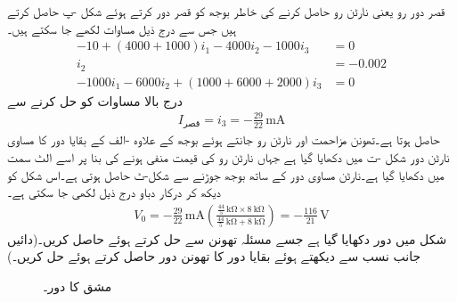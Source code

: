 قصر دور رو یعنی نارٹن رو حاصل کرنے کی خاطر  بوجھ کو قصر دور کرتے ہوئے شکل  -پ  حاصل کرتے ہیں جس سے درج ذیل مساوات لکھے جا سکتے ہیں۔
\begin{align*}
-10+(4000+1000)i_1-4000 i_2 - 1000 i_3&=0\\
i_2&=-0.002\\
-1000 i_1-6000i_2+(1000+6000+2000)i_3&=0
\end{align*} 
درج بالا مساوات کو حل کرنے سے
\begin{align*}
I_{\text{قصر}}=i_3=-\frac{29}{22} \, \si{\milli\ampere}
\end{align*}
حاصل ہوتا ہے۔تھونن مزاحمت اور نارٹن رو جانتے ہوئے    بوجھ کے علاوہ -الف کے بقایا دور کا مساوی نارٹن  دور شکل -ت میں دکھایا گیا ہے جہاں نارٹن رو کی قیمت منفی ہونے کی بنا پر اسے الٹ سمت میں دکھایا گیا ہے۔نارٹن مساوی دور کے ساتھ  بوجھ جوڑنے سے شکل-ٹ حاصل ہوتی ہے۔اس شکل کو دیکھ کر درکار دباو درج ذیل لکھی جا سکتی ہے۔
\begin{align*}
V_0=-\frac{29}{22}\, \si{\milli\ampere} \left(\frac{\frac{44}{5}\, \si{\kilo\ohm}\times \SI{8}{\kilo\ohm}}{\frac{44}{5}\, \si{\kilo\ohm} + \SI{8}{\kilo\ohm}} \right)=-\frac{116}{21} \, \si{\volt}
\end{align*}
شکل  میں دور دکھایا گیا ہے جسے  مسئلہ تھونن سے حل کرتے ہوئے  حاصل کریں۔(دائیں جانب نسب  سے دیکھتے ہوئے بقایا دور کا تھونن دور حاصل کرتے ہوئے حل کریں۔)
\begin{figure}
\centering
{}
\caption{مشق  کا دور۔}
\label{شکل_مسئلہ_مشق_تھونن_الف}
\end{figure}

